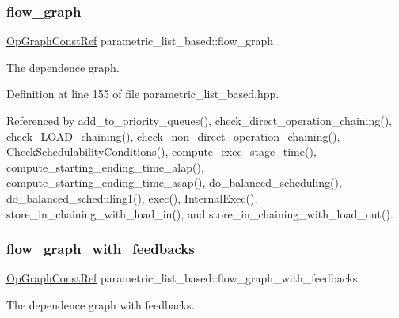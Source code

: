 \subsubsection{\texorpdfstring{flow\+\_\+graph}{flow\_graph}}
{\footnotesize\ttfamily \hyperlink{op__graph_8hpp_a9a0b240622c47584bee6951a6f5de746}{Op\+Graph\+Const\+Ref} parametric\+\_\+list\+\_\+based\+::flow\+\_\+graph\hspace{0.3cm}{\ttfamily [private]}}



The dependence graph. 



Definition at line 155 of file parametric\+\_\+list\+\_\+based.\+hpp.



Referenced by add\+\_\+to\+\_\+priority\+\_\+queues(), check\+\_\+direct\+\_\+operation\+\_\+chaining(), check\+\_\+\+L\+O\+A\+D\+\_\+chaining(), check\+\_\+non\+\_\+direct\+\_\+operation\+\_\+chaining(), Check\+Schedulability\+Conditions(), compute\+\_\+exec\+\_\+stage\+\_\+time(), compute\+\_\+starting\+\_\+ending\+\_\+time\+\_\+alap(), compute\+\_\+starting\+\_\+ending\+\_\+time\+\_\+asap(), do\+\_\+balanced\+\_\+scheduling(), do\+\_\+balanced\+\_\+scheduling1(), exec(), Internal\+Exec(), store\+\_\+in\+\_\+chaining\+\_\+with\+\_\+load\+\_\+in(), and store\+\_\+in\+\_\+chaining\+\_\+with\+\_\+load\+\_\+out().

\mbox{\label{classparametric__list__based_a98268bf165c0c6b4236a7ea55b24d268}} 
\subsubsection{\texorpdfstring{flow\+\_\+graph\+\_\+with\+\_\+feedbacks}{flow\_graph\_with\_feedbacks}}
{\footnotesize\ttfamily \hyperlink{op__graph_8hpp_a9a0b240622c47584bee6951a6f5de746}{Op\+Graph\+Const\+Ref} parametric\+\_\+list\+\_\+based\+::flow\+\_\+graph\+\_\+with\+\_\+feedbacks\hspace{0.3cm}{\ttfamily [private]}}



The dependence graph with feedbacks. 



